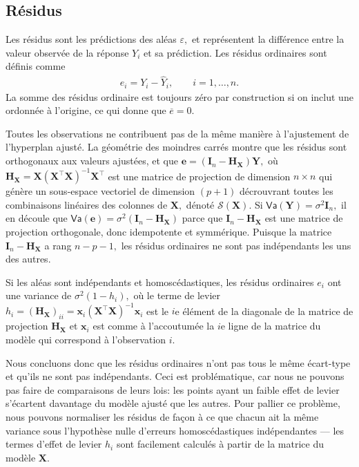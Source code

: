 \documentclass[
  11pt,
  letterpaper,
]{scrbook}
\theoremstyle{plain}
\theoremstyle{plain}
\theoremstyle{definition}
\theoremstyle{definition}
\theoremstyle{remark}
\begin{document}
\subsection{Résidus}\label{ruxe9sidus}

Les résidus sont les prédictions des aléas \(\varepsilon,\) et
représentent la différence entre la valeur observée de la réponse
\(Y_i\) et sa prédiction. Les résidus ordinaires sont définis comme
\begin{align*}
e_i=Y_i-\widehat{Y}_i, \qquad i =1, \ldots, n.
\end{align*} La somme des résidus ordinaire est toujours zéro par
construction si on inclut une ordonnée à l'origine, ce qui donne que
\(\overline{e} = 0.\)

Toutes les observations ne contribuent pas de la même manière à
l'ajustement de l'hyperplan ajusté. La géométrie des moindres carrés
montre que les résidus sont orthogonaux aux valeurs ajustées, et que
\(\boldsymbol{e} = (\mathbf{I}_n-\mathbf{H}_{\mathbf{X}})\boldsymbol{Y},\)
où
\(\mathbf{H}_{\mathbf{X}}=\mathbf{X}(\mathbf{X}^\top\mathbf{X})^{-1}\mathbf{X}^\top\)
est une matrice de projection de dimension \(n \times n\) qui génère un
sous-espace vectoriel de dimension \((p+1)\) décrouvrant toutes les
combinaisons linéaires des colonnes de \(\mathbf{X},\) dénoté
\(\mathscr{S}(\mathbf{X}).\) Si
\(\mathsf{Va}(\boldsymbol{Y}) = \sigma^2\mathbf{I}_n,\) il en découle
que
\(\mathsf{Va}(\boldsymbol{e})=\sigma^2(\mathbf{I}_n-\mathbf{H}_{\mathbf{X}})\)
parce que \(\mathbf{I}_n-\mathbf{H}_{\mathbf{X}}\) est une matrice de
projection orthogonale, donc idempotente et symmérique. Puisque la
matrice \(\mathbf{I}_n-\mathbf{H}_{\mathbf{X}}\) a rang \(n-p-1,\) les
résidus ordinaires ne sont pas indépendants les uns des autres.

Si les aléas sont indépendants et homoscédastiques, les résidus
ordinaires \(e_i\) ont une variance de \(\sigma^2(1-h_{i}),\) où le
terme de levier
\(h_i =(\mathbf{H}_{\mathbf{X}})_{ii} = \mathbf{x}_i (\mathbf{X}^\top\mathbf{X})^{-1}\mathbf{x}_i\)
est le \(i\)e élément de la diagonale de la matrice de projection
\(\mathbf{H}_{\mathbf{X}}\) et \(\mathbf{x}_i\) est comme à l'accoutumée
la \(i\)e ligne de la matrice du modèle qui correspond à l'observation
\(i.\)

Nous concluons donc que les résidus ordinaires n'ont pas tous le même
écart-type et qu'ils ne sont pas indépendants. Ceci est problématique,
car nous ne pouvons pas faire de comparaisons de leurs lois: les points
ayant un faible effet de levier s'écartent davantage du modèle ajusté
que les autres. Pour pallier ce problème, nous pouvons normaliser les
résidus de façon à ce que chacun ait la même variance sous l'hypothèse
nulle d'erreurs homoscédastiques indépendantes --- les termes d'effet de
levier \(h_i\) sont facilement calculés à partir de la matrice du modèle
\(\mathbf{X}.\)
\end{document}
